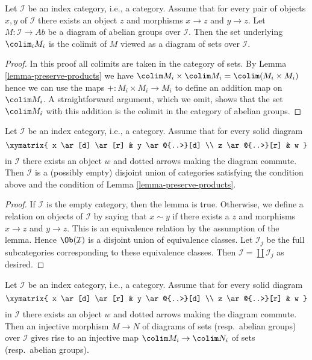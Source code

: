 \begin{lemma}
\label{lemma-colimits-abelian-as-sets}
Let $\mathcal{I}$ be an index category, i.e., a category. Assume
that for every pair of objects $x, y$ of $\mathcal{I}$
there exists an object $z$ and morphisms $x \to z$ and $y \to z$.
Let $M : \mathcal{I} \to \textit{Ab}$ be a diagram of abelian
groups over $\mathcal{I}$. Then the set underlying $\colim_i M_i$
is the colimit of $M$ viewed as a diagram of sets over $\mathcal{I}$.
\end{lemma}

\begin{proof}
In this proof all colimits are taken in the category of sets.
By Lemma \ref{lemma-preserve-products} we have
$\colim M_i \times \colim M_i = \colim (M_i \times M_i)$
hence we can use the maps $+ : M_i \times M_i \to M_i$
to define an addition map on $\colim M_i$. A straightforward
argument, which we omit, shows that the set $\colim M_i$ with this
addition is the colimit in the category of abelian groups.
\end{proof}

\begin{lemma}
\label{lemma-split-into-connected}
Let $\mathcal{I}$ be an index category, i.e., a category. Assume
that for every solid diagram
$$
\xymatrix{
x \ar[d] \ar[r] & y \ar@{..>}[d] \\
z \ar@{..>}[r] & w
}
$$
in $\mathcal{I}$ there exists an object $w$ and dotted arrows
making the diagram commute. Then $\mathcal{I}$ is a (possibly empty)
disjoint union of categories satisfying the condition above and
the condition of Lemma \ref{lemma-preserve-products}.
\end{lemma}

\begin{proof}
If $\mathcal{I}$ is the empty category, then the lemma is true.
Otherwise, we define a relation on objects of $\mathcal{I}$ by
saying that $x \sim y$ if there exists a $z$ and
morphisms $x \to z$ and $y \to z$. This is an equivalence
relation by the assumption of the lemma. Hence $\Ob(\mathcal{I})$
is a disjoint union of equivalence classes. Let $\mathcal{I}_j$
be the full subcategories corresponding to these equivalence classes.
Then $\mathcal{I} = \coprod \mathcal{I}_j$ as desired.
\end{proof}

\begin{lemma}
\label{lemma-preserve-injective-maps}
Let $\mathcal{I}$ be an index category, i.e., a category. Assume
that for every solid diagram
$$
\xymatrix{
x \ar[d] \ar[r] & y \ar@{..>}[d] \\
z \ar@{..>}[r] & w
}
$$
in $\mathcal{I}$ there exists an object $w$ and dotted arrows
making the diagram commute. Then an injective morphism $M \to N$
of diagrams of sets (resp.\ abelian groups) over $\mathcal{I}$ gives
rise to an injective map $\colim M_i \to \colim N_i$ of sets
(resp.\ abelian groups).
\end{lemma}

